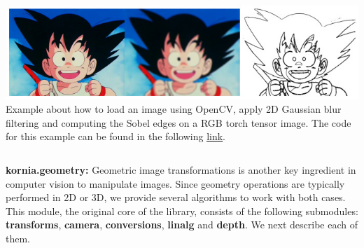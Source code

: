 \begin{tcolorbox}[every float=\centering, drop shadow, title=Example 4: Image filtering and Edge detection]
    \label{fig:examples:filters}
    \includegraphics[width=1.\linewidth]{main/chapter03/data/examples/goku_filters.jpg}
    {Example about how to load an image using OpenCV, apply  2D Gaussian blur filtering and computing the Sobel edges on a RGB torch tensor image. The code for this example can be found in the following \underline{\color{blue}\href{https://colab.research.google.com/drive/1IiNHo5TjgQShrI7XoMOtam3PyZ9FNToh}{link}}.}
    \inputminted[python3, baselinestretch=1., style=vs, fontfamily=courier, fontsize=\footnotesize, funcnamehighlighting=true]{python}{main/chapter03/data/examples/snipet_filters.py}
\end{tcolorbox}

\newpage

\textbf{kornia.geometry:} Geometric image transformations is another key ingredient in computer vision to manipulate images. Since geometry operations are typically performed in 2D or 3D,  we provide several algorithms to work with both cases. This module, the original core of the library, consists of the following submodules: \textbf{transforms}, \textbf{camera}, \textbf{conversions}, \textbf{linalg} and \textbf{depth}. We next describe each of them.

